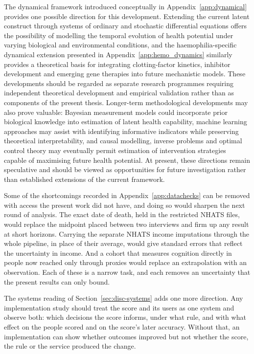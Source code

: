 The dynamical framework introduced conceptually in Appendix~\ref{app:dynamical} provides one possible direction for this development. Extending the current latent construct through systems of ordinary and stochastic differential equations offers the possibility of modelling the temporal evolution of health potential under varying biological and environmental conditions, and the haemophilia-specific dynamical extension presented in Appendix~\ref{app:hemo_dynamics} similarly provides a theoretical basis for integrating clotting-factor kinetics, inhibitor development and emerging gene therapies into future mechanistic models. These developments should be regarded as separate research programmes requiring independent theoretical development and empirical validation rather than as components of the present thesis. Longer-term methodological developments may also prove valuable: Bayesian measurement models could incorporate prior biological knowledge into estimation of latent health capability, machine learning approaches may assist with identifying informative indicators while preserving theoretical interpretability, and causal modelling, inverse problems and optimal control theory may eventually permit estimation of intervention strategies capable of maximising future health potential. At present, these directions remain speculative and should be viewed as opportunities for future investigation rather than established extensions of the current framework.

Some of the shortcomings recorded in Appendix~\ref{app:datachecks} can be removed
with access the present work did not have, and doing so would sharpen the next
round of analysis. The exact date of death, held in the restricted NHATS files,
would replace the midpoint placed between two interviews and firm up any result at
short horizons. Carrying the separate NHATS income imputations through the whole
pipeline, in place of their average, would give standard errors that reflect the
uncertainty in income. And a cohort that measures cognition directly in people now
reached only through proxies would replace an extrapolation with an observation.
Each of these is a narrow task, and each removes an uncertainty that the present
results can only bound.

The systems reading of Section~\ref{sec:disc-systems} adds one more direction. Any
implementation study should treat the score and its users as one system and observe
both: which decisions the score informs, under what rule, and with what effect on
the people scored and on the score's later accuracy. Without that, an
implementation can show whether outcomes improved but not whether the score, the
rule or the service produced the change.

